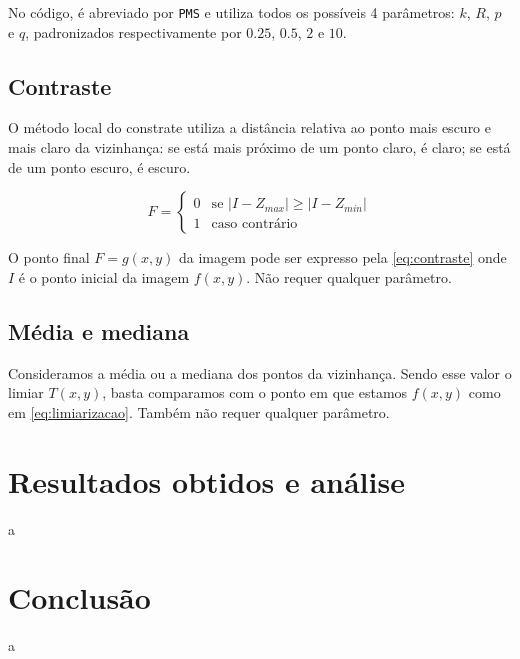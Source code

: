 \documentclass[brazilian,a4paper,twocolumn]{article}
\begin{document}
        No código, é abreviado por \texttt{PMS} e utiliza todos os possíveis 4 parâmetros: $k$, $R$, $p$ e $q$, padronizados respectivamente por $0.25$, $0.5$, $2$ e $10$.

    \subsection{Contraste}

        O método local do constrate utiliza a distância relativa ao ponto mais escuro e mais claro da vizinhança: se está mais próximo de um ponto claro, é claro; se está de um ponto escuro, é escuro.

        \begin{equation}
        \label{eq:contraste}
            F =
            \begin{cases}
                0       & \text{se $\mathopen|I - Z_{max}\mathclose| \geq \mathopen|I - Z_{min}\mathclose|$} \\
                1       & \text{caso contrário}
            \end{cases}
        \end{equation}

        O ponto final $F = g(x, y)$ da imagem pode ser expresso pela \cref{eq:contraste} onde $I$ é o ponto inicial da imagem $f(x, y)$. Não requer qualquer parâmetro.

    \subsection{Média e mediana}

        Consideramos a média ou a mediana dos pontos da vizinhança. Sendo esse valor o limiar $T(x, y)$, basta comparamos com o ponto em que estamos $f(x, y)$ como em \cref{eq:limiarizacao}. Também não requer qualquer parâmetro.


\section{Resultados obtidos e análise}

    a


\section{Conclusão}

    a
\end{document}
